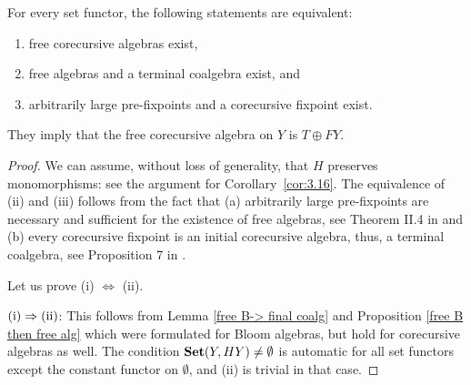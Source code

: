 \documentclass{LMCS}
\theoremstyle{plain}
\theoremstyle{definition}
\numberwithin{equation}{section}
\begin{document}
\begin{thm}\label{equivalence 1}
For every set functor, the following statements are equivalent:
\begin{enumerate}[label=(\roman*)]
\item free corecursive algebras exist,
\item free algebras and a terminal coalgebra exist, and
\item arbitrarily large pre-fixpoints and a corecursive fixpoint
  exist.
\end{enumerate}
They imply that the free corecursive algebra on $Y$ is $T\oplus FY$.
\end{thm}
\begin{proof}
  We can assume, without loss of generality, that $H$ preserves
  monomorphisms: see the argument for Corollary~\ref{cor:3.16}.  The
  equivalence of (ii) and (iii) follows from the fact that (a)
  arbitrarily large pre-fixpoints are necessary and sufficient for the
  existence of free algebras, see Theorem II.4 in \cite{takr} and (b)
  every corecursive fixpoint is an initial corecursive algebra, thus,
  a terminal coalgebra, see Proposition 7 in \cite{cuv2}.

Let us prove (i) $\Leftrightarrow$ (ii).

\smallskip\noindent
${\rm (i)\Rightarrow (ii)}$: This follows from Lemma \ref{free B-> final coalg} and Proposition \ref{free B then free alg} which were formulated for Bloom algebras, but hold for corecursive algebras as well. The condition ${\bf Set}(Y,HY) \neq \emptyset$ is automatic for all set functors except the constant functor on $\emptyset$, and (ii) is trivial in that case.


\end{proof}
\end{document}
